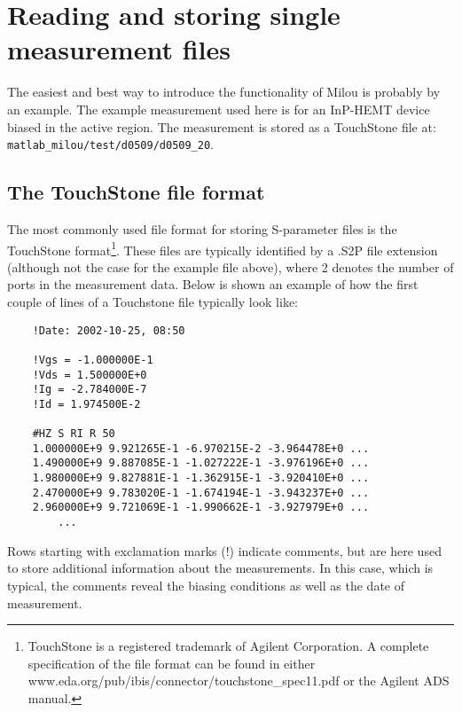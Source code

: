 %
\section{Reading and storing single measurement files}
The easiest and best way to introduce the functionality of Milou
is probably by an example. The example measurement used here is
for an InP-HEMT device biased in the active region. The
measurement is stored as a TouchStone file at: \newline
\verb"matlab_milou/test/d0509/d0509_20".

\subsection{The TouchStone file format}
The most commonly used file format for storing S-parameter files
is the TouchStone format\footnote{TouchStone is a registered
trademark of Agilent Corporation. A complete specification of the
file format can be found in either
www.eda.org/pub/ibis/connector/touchstone\_spec11.pdf or the
Agilent ADS manual.}. These files are typically identified by a
.S2P file extension (although not the case for the example file
above), where 2 denotes the number of ports in the measurement
data. Below is shown an example of how the first couple of lines
of a Touchstone file typically look like:
\begin{small}
\begin{verbatim}
    !Date: 2002-10-25, 08:50

    !Vgs = -1.000000E-1
    !Vds = 1.500000E+0
    !Ig = -2.784000E-7
    !Id = 1.974500E-2

    #HZ S RI R 50
    1.000000E+9 9.921265E-1 -6.970215E-2 -3.964478E+0 ...
    1.490000E+9 9.887085E-1 -1.027222E-1 -3.976196E+0 ...
    1.980000E+9 9.827881E-1 -1.362915E-1 -3.920410E+0 ...
    2.470000E+9 9.783020E-1 -1.674194E-1 -3.943237E+0 ...
    2.960000E+9 9.721069E-1 -1.990662E-1 -3.927979E+0 ...
        ...
\end{verbatim}
\end{small}
Rows starting with exclamation marks (!) indicate comments, but
are here used to store additional information about the
measurements. In this case, which is typical, the comments reveal
the biasing conditions as well as the date of measurement.


